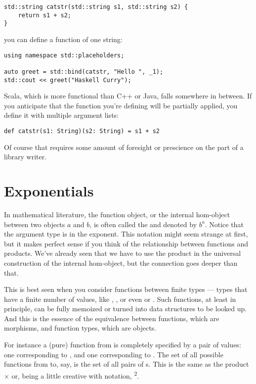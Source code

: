 \begin{Verbatim}
std::string catstr(std::string s1, std::string s2) {
    return s1 + s2;
}
\end{Verbatim}
you can define a function of one string:

\begin{Verbatim}
using namespace std::placeholders;

auto greet = std::bind(catstr, "Hello ", _1);
std::cout << greet("Haskell Curry");
\end{Verbatim}
Scala, which is more functional than C++ or Java, falls somewhere in
between. If you anticipate that the function you're defining will be
partially applied, you define it with multiple argument lists:

\begin{Verbatim}
def catstr(s1: String)(s2: String) = s1 + s2
\end{Verbatim}
Of course that requires some amount of foresight or prescience on the
part of a library writer.

\section{Exponentials}

In mathematical literature, the function object, or the internal
hom-object between two objects $a$ and $b$, is often
called the  and denoted by $b^{a}$. Notice that
the argument type is in the exponent. This notation might seem strange
at first, but it makes perfect sense if you think of the relationship
between functions and products. We've already seen that we have to use
the product in the universal construction of the internal hom-object,
but the connection goes deeper than that.

This is best seen when you consider functions between finite types ---
types that have a finite number of values, like ,
, or even  or . Such functions,
at least in principle, can be fully memoized or turned into data
structures to be looked up. And this is the essence of the equivalence
between functions, which are morphisms, and function types, which are
objects.

For instance a (pure) function from  is completely
specified by a pair of values: one corresponding to , and
one corresponding to . The set of all possible functions
from  to, say,  is the set of all pairs of
s. This is the same as the product  ×  or,
being a little creative with notation, \textsuperscript{2}.

